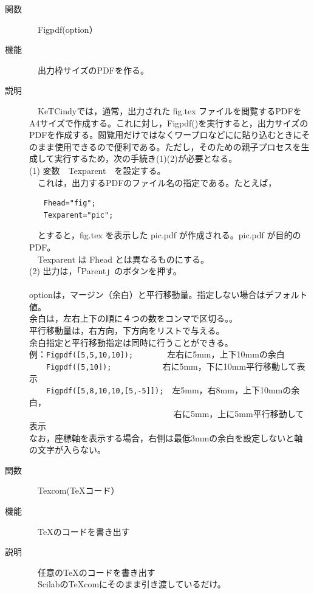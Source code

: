\documentclass[papersize,a4paper,12pt,uplatex]{jsarticle}
\begin{document}
\begin{description}
\hypertarget{figpdf}{}
\item[関数]　Figpdf(option）
\item[機能]　出力枠サイズのPDFを作る。
\item[説明]　KeTCindyでは，通常，出力された fig.tex ファイルを閲覧するPDFをA4サイズで作成する。これに対し，Figpdf()を実行すると，出力サイズのPDFを作成する。閲覧用だけではなくワープロなどにに貼り込むときにそのまま使用できるので便利である。ただし，そのための親子プロセスを生成して実行するため，次の手続き(1)(2)が必要となる。\\
(1) 変数　Texparent　を設定する。\\
　これは，出力するPDFのファイル名の指定である。たとえば，
\begin{verbatim}
　　Fhead="fig";
　　Texparent="pic";
\end{verbatim}
　とすると，fig.tex を表示した pic.pdf が作成される。pic.pdf が目的のPDF。\\
　Texparent は Fhead とは異なるものにする。\\
(2) 出力は，「Parent」のボタンを押す。\\
　\\
optionは，マージン（余白）と平行移動量。指定しない場合はデフォルト値。\\
余白は，左右上下の順に４つの数をコンマで区切る。。\\ 
平行移動量は，右方向，下方向をリストで与える。\\
余白指定と平行移動指定は同時に行うことができる。\\
例：\verb|Figpdf([5,5,10,10]);|　　　　左右に5mm，上下10mmの余白\\
　　\verb|Figpdf([5,10]);|　　　　　　右に5mm，下に10mm平行移動して表示\\
　　\verb|Figpdf([5,8,10,10,[5,-5]]);|　左5mm，右8mm，上下10mmの余白，\\
　　　　　　　　　　　　　　　　　右に5mm，上に5mm平行移動して表示\\
なお，座標軸を表示する場合，右側は最低3mmの余白を設定しないと軸の文字が入らない。\\

\hypertarget{texcom}{}
\item[関数]　Texcom(\TeX コード）
\item[機能]　\TeX のコードを書き出す
\item[説明]　任意の\TeX のコードを書き出す\\
　ScilabのTeXcomにそのまま引き渡しているだけ。\\


\end{description}
\end{document}
